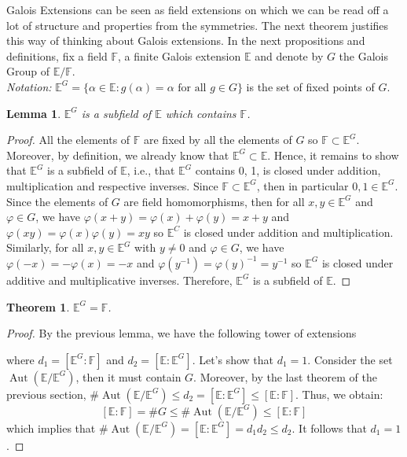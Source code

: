 \documentclass{article}
\newtheorem*{theorem}{Theorem}
\newtheorem*{lemma}{Lemma}
\newcommand{\F}{\mathbb{F}}
\newcommand{\E}{\mathbb{E}}
\DeclareMathOperator{\Aut}{\text{Aut}}
\newenvironment{notation}{\noindent\textit{Notation:}}{}
\begin{document}
Galois Extensions can be seen as field extensions on which we can be read off a lot of structure and properties from the symmetries. The next theorem justifies this way of thinking about Galois extensions. In the next propositions and definitions, fix a field $\F$, a finite Galois extension $\E$ and denote by $G$ the Galois Group of $\E / \F$. \\

\begin{notation}
    $\E^G = \{\alpha \in \E : g(\alpha) = \alpha \text{ for all } g\in G\}$ is the set of fixed points of $G$.
\end{notation}

\begin{lemma}
    $\E^G$ is a subfield of $\E$ which contains $\F$.
\end{lemma}

\begin{proof}
    All the elements of $\F$ are fixed by all the elements of $G$ so $\F \subset \E^G$. Moreover, by definition, we already know that $\E^G \subset \E$. Hence, it remains to show that $\E^G$ is a subfield of $\E$, i.e., that $\E^G$ contains 0, 1, is closed under addition, multiplication and respective inverses. Since $\F \subset \E^G$, then in particular $0,1 \in \E^G$. Since the elements of $G$ are field homomorphisms, then for all $x,y \in \E^G$ and $\varphi \in G$, we have $\varphi(x + y) = \varphi(x) + \varphi(y) = x + y$ and $\varphi(xy) = \varphi(x)\varphi(y) = xy$ so $\E^C$ is closed under addition and multiplication. Similarly, for all $x,y \in \E^G$ with $y \neq 0$ and $\varphi \in G$, we have $\varphi(-x) = -\varphi(x) = -x$ and $\varphi(y^{-1}) = \varphi(y)^{-1} = y^{-1}$ so $\E^G$ is closed under additive and multiplicative inverses. Therefore, $\E^G$ is a subfield of $\E$.
\end{proof}

\begin{theorem}
    $\E^G = \F$.
\end{theorem}

\begin{proof}
    By the previous lemma, we have the following tower of extensions
    \begin{center}
    \end{center}
    where $d_1 = [\E^G : \F]$ and $d_2 = [\E : \E^G]$. Let's show that $d_1 = 1$. Consider the set $\Aut(\E / \E^G)$, then it must contain $G$. Moreover, by the last theorem of the previous section, $\# \Aut(\E / \E^G) \leq d_2 = [\E : \E^G] \leq [\E : \F]$. Thus, we obtain:
    $$[\E : \F] = \# G \leq \# \Aut(\E / \E^G) \leq [\E : \F]$$
    which implies that $\# \Aut(\E / \E^G) = [\E : \E^G] = d_1 d_2 \leq d_2$. It follows that $d_1 = 1$. 
\end{proof}
\end{document}

